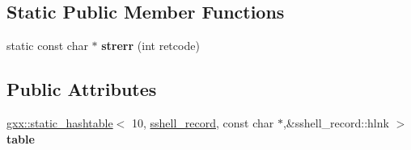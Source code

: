 \subsection*{Static Public Member Functions}
\begin{DoxyCompactItemize}
\item 
static const char $\ast$ {\bfseries strerr} (int retcode)\hypertarget{classgxx_1_1sshell_a0d0f5afabe5c017c195a7d45e90c362f}{}\label{classgxx_1_1sshell_a0d0f5afabe5c017c195a7d45e90c362f}

\end{DoxyCompactItemize}
\subsection*{Public Attributes}
\begin{DoxyCompactItemize}
\item 
\hyperlink{classgxx_1_1static__hashtable}{gxx\+::static\+\_\+hashtable}$<$ 10, \hyperlink{classgxx_1_1sshell__record}{sshell\+\_\+record}, const char $\ast$,\&sshell\+\_\+record\+::hlnk $>$ {\bfseries table}\hypertarget{classgxx_1_1sshell_a92ce6a26e9089f4b22381c440473d1f0}{}\label{classgxx_1_1sshell_a92ce6a26e9089f4b22381c440473d1f0}

\end{DoxyCompactItemize}
